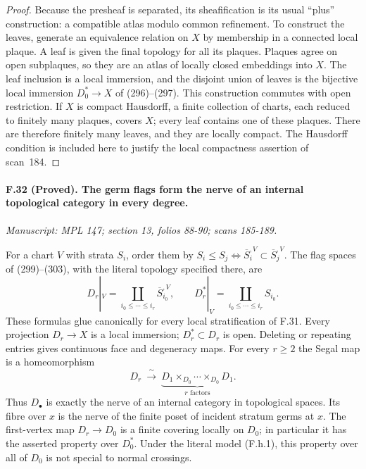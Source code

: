 \begin{proof}
Because the presheaf is separated, its sheafification is its usual
``plus'' construction: a compatible atlas modulo common refinement.
To construct the leaves, generate an equivalence relation on $X$ by
membership in a connected local plaque. A leaf is given the final
topology for all its plaques. Plaques agree on open subplaques, so they
are an atlas of locally closed embeddings into $X$. The leaf inclusion
is a local immersion, and the disjoint union of leaves is the bijective
local immersion $D_0^*\to X$ of (296)--(297). This construction commutes
with open restriction. If $X$ is compact Hausdorff, a finite collection
of charts, each reduced to finitely many plaques, covers $X$; every leaf
contains one of these plaques. There are therefore finitely many leaves,
and they are locally compact. The Hausdorff condition is included here
to justify the local compactness assertion of scan~184.
\end{proof}

\paragraph{F.32 (Proved). The germ flags form the nerve of an internal
topological category in every degree.}
\textit{Manuscript: MPL 147; section 13, folios 88-90; scans 185-189.}

For a chart $V$ with strata $S_i$, order them by
$S_i\leq S_j\iff\overline S_i^{,V}\subset\overline S_j^{,V}$.
The flag spaces of (299)--(303), with the literal topology specified
there, are
\[
 D_r|_V=
 \coprod_{i_0\leq\cdots\leq i_r}\overline S_{i_0}^{,V},
 \qquad
 D_r^*|_V=
 \coprod_{i_0\leq\cdots\leq i_r}S_{i_0}.
 \tag{F.h.1}
\]
These formulas glue canonically for every local stratification of F.31.
Every projection $D_r\to X$ is a local immersion; $D_r^*\subset D_r$
is open. Deleting or repeating entries gives continuous face and
degeneracy maps. For every $r\geq2$ the Segal map is a homeomorphism
\[
 D_r\ \xrightarrow{\ \sim\ }\
 \underbrace{D_1\times_{D_0}\cdots\times_{D_0}D_1}_{r\text{ factors}}.
 \tag{F.h.2}
\]
Thus $D_\bullet$ is exactly the nerve of an internal category in
topological spaces. Its fibre over $x$ is the nerve of the finite poset
of incident stratum germs at $x$. The first-vertex map $D_r\to D_0$ is
a finite covering locally on $D_0$; in particular it has the asserted
property over $D_0^*$. Under the literal model (F.h.1), this property
over all of $D_0$ is not special to normal crossings.

